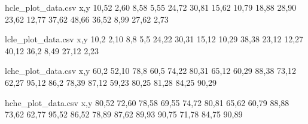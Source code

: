\begingroup\newif\ifmy
{}
\ifmy
\begin{filecontents*}{hcle_plot_data.csv}
x,y
10,52
2,60
8,58
5,55
24,72
30,81
15,62
10,79
18,88
28,90
23,62
12,77
37,62
48,66
36,52
8,99
27,62
2,73
\end{filecontents*}
\fi\endgroup

\begingroup\newif\ifmy
{}
\ifmy
\begin{filecontents*}{lcle_plot_data.csv}
x,y
10,2
2,10
8,8
5,5
24,22
30,31
15,12
10,29
38,38
23,12
12,27
40,12
36,2
8,49
27,12
2,23
\end{filecontents*}
\fi\endgroup

\begingroup\newif\ifmy
{}
\ifmy
\begin{filecontents*}{lche_plot_data.csv}
x,y
60,2
52,10
78,8
60,5
74,22
80,31
65,12
60,29
88,38
73,12
62,27
95,12
86,2
78,39
87,12
59,23
80,25
81,28
84,25
90,29
\end{filecontents*}
\fi\endgroup

\begingroup\newif\ifmy
{}
\ifmy
\begin{filecontents*}{hche_plot_data.csv}
x,y
80,52
72,60
78,58
69,55
74,72
80,81
65,62
60,79
88,88
73,62
62,77
95,52
86,52
78,89
87,62
89,93
90,75
71,78
84,75
90,89
\end{filecontents*}
\fi\endgroup